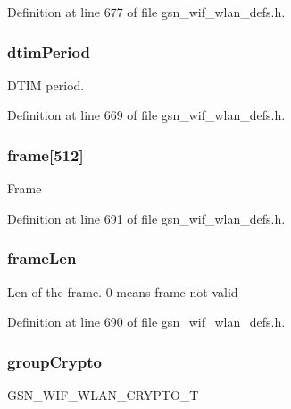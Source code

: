 Definition at line 677 of file gsn\_\-wif\_\-wlan\_\-defs.h.

\hypertarget{a00374_a299cd846e383cf8f77d0c2e71083caba}{
\subsubsection[{dtimPeriod}]{ {\bf dtimPeriod}}}
\label{a00374_a299cd846e383cf8f77d0c2e71083caba}
DTIM period. 

Definition at line 669 of file gsn\_\-wif\_\-wlan\_\-defs.h.

\hypertarget{a00374_a48225b5f4127dffd17119dcdce7ad5b6}{
\subsubsection[{frame}]{ {\bf frame}\mbox{[}512\mbox{]}}}
\label{a00374_a48225b5f4127dffd17119dcdce7ad5b6}
Frame 

Definition at line 691 of file gsn\_\-wif\_\-wlan\_\-defs.h.

\hypertarget{a00374_ad7d37183f86bdd7a3c11db21c3301b32}{
\subsubsection[{frameLen}]{ {\bf frameLen}}}
\label{a00374_ad7d37183f86bdd7a3c11db21c3301b32}
Len of the frame. 0 means frame not valid 

Definition at line 690 of file gsn\_\-wif\_\-wlan\_\-defs.h.

\hypertarget{a00374_ada57203c7d5f11c7d66faf0a7d619b99}{
\subsubsection[{groupCrypto}]{ {\bf groupCrypto}}}
\label{a00374_ada57203c7d5f11c7d66faf0a7d619b99}
GSN\_\-WIF\_\-WLAN\_\-CRYPTO\_\-T 

